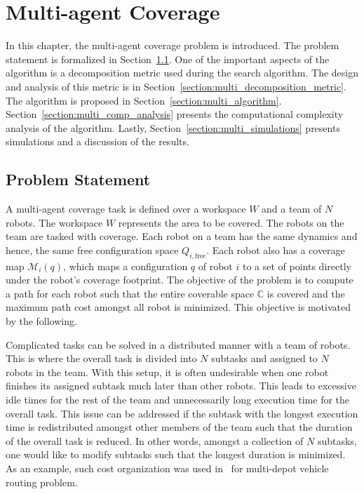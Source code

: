 \documentclass[../main.tex]{subfiles}
\begin{document}
\chapter{Multi-agent Coverage}
\label{chapter:multi_agent_coverage}

In this chapter, the multi-agent coverage problem is introduced. The problem statement is formalized in Section~\ref{section:multi_agent_problem_statement}. One of the important aspects of the algorithm is a decomposition metric used during the search algorithm. The design and analysis of this metric is in Section~\ref{section:multi_decomposition_metric}. The algorithm is proposed in Section~\ref{section:multi_algorithm}. Section~\ref{section:multi_comp_analysis} presents the computational complexity analysis of the algorithm. Lastly, Section~\ref{section:multi_simulations} presents simulations and a discussion of the results.


\section{Problem Statement}
\label{section:multi_agent_problem_statement}

A multi-agent coverage task is defined over a workspace $W$ and a team of $N$ robots. The workspace $W$ represents the area to be covered. The robots on the team are tasked with coverage. Each robot on a team has the same dynamics and hence, the same free configuration space $Q_{i,\text{free}}$. Each robot also has a coverage map $\mathcal{M}_i(q)$, which maps a configuration $q$ of robot $i$ to a set of points directly under the robot's coverage footprint. The objective of the problem is to compute a path for each robot such that the entire coverable space $\mathbb{C}$ is covered and the maximum path cost amongst all robot is minimized. This objective is motivated by the following.

Complicated tasks can be solved in a distributed manner with a team of robots. This is where the overall task is divided into $N$ subtasks and assigned to $N$ robots in the team. With this setup, it is often undesirable when one robot finishes its assigned subtask much later than other robots. This leads to excessive idle times for the rest of the team and unnecessarily long execution time for the overall task. This issue can be addressed if the subtask with the longest execution time is redistributed amongst other members of the team such that the duration of the overall task is reduced. In other words, amongst a collection of $N$ subtasks, one would like to modify subtasks such that the longest duration is minimized. As an example, such cost organization was used in~\cite{carlsson2009solving} for multi-depot vehicle routing problem.
\end{document}
